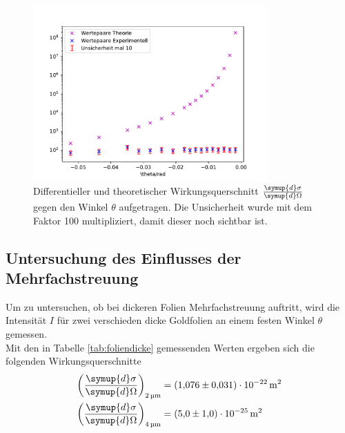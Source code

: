 \begin{figure}
    \centering
    \includegraphics[width=0.8\textwidth]{data/plots/Rutherford.pdf}
    \caption{Differentieller und theoretischer Wirkungsquerschnitt $\frac{\symup{d}\sigma}{\symup{d}\Omega}$ gegen den Winkel $\theta$ aufgetragen. Die Unsicherheit wurde mit dem Faktor 100 multipliziert, damit dieser noch sichtbar ist.}
    \label{fig:ruther}
\end{figure}

\subsection{Untersuchung des Einflusses der Mehrfachstreuung}
Um zu untersuchen, ob bei dickeren Folien Mehrfachstreuung auftritt, wird die Intensität $I$ für zwei verschieden dicke Goldfolien an einem festen Winkel $\theta$ gemessen. \\
Mit den in Tabelle \ref{tab:foliendicke} gemessenden Werten ergeben sich die folgenden Wirkungsquerschnitte
\begin{align*}
    \left(\frac{\symup{d}\sigma}{\symup{d}\Omega}\right)_\text{\SI{2}{\micro \meter}} &= \SI{1,076(31)e-22}{\meter}^2 \\
    \left(\frac{\symup{d}\sigma}{\symup{d}\Omega}\right)_\text{\SI{4}{\micro \meter}} &= \SI{5,0(10)e-25}{\meter}^2
\end{align*} 


